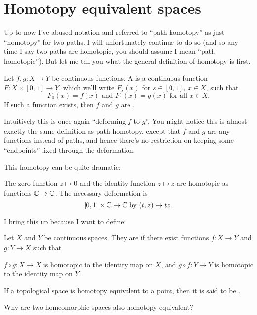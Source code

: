 \section{Homotopy equivalent spaces}
Up to now I've abused notation and referred to ``path homotopy'' as just ``homotopy'' for two paths.
I will unfortunately continue to do so (and so any time I say two paths are homotopic, you should assume I mean ``path-homotopic'').
But let me tell you what the general definition of homotopy is first.
\begin{definition}
	Let $f,g : X \to Y$ be continuous functions.
	A  is a continuous function $F : X \times [0,1] \to Y$,
	which we'll write $F_s(x)$ for $s \in [0,1]$, $x \in X$, such that 
	\[ F_0(x) = f(x) \text{ and } F_1(x) = g(x) \text{ for all $x \in X$.} \]
	If such a function exists, then $f$ and $g$ are .
\end{definition}
Intuitively this is once again ``deforming $f$ to $g$''.
You might notice this is almost exactly the same definition as path-homotopy,
except that $f$ and $g$ are any functions instead of paths, and hence
there's no restriction on keeping some ``endpoints'' fixed through the deformation.

This homotopy can be quite dramatic:
\begin{example}
	The zero function $z \mapsto 0$ and the identity function $z \mapsto z$
	are homotopic as functions $\mathbb C \to \mathbb C$.
	The necessary deformation is
	\[ [0,1] \times \mathbb C \to \mathbb C \text{ by } (t,z) \mapsto tz. \]
\end{example}

I bring this up because I want to define:
\begin{definition}
	Let $X$ and $Y$ be continuous spaces.
	They are  if there exist
	functions $f : X \to Y$ and $g : Y \to X$ such that
	\begin{enumerate}[(i)]
		\ii $f \circ g : X \to X$ is homotopic to the identity map on $X$, and
		\ii $g \circ f : Y \to Y$ is homotopic to the identity map on $Y$.
	\end{enumerate}
	If a topological space is homotopy equivalent to a point,
	then it is said to be .
\end{definition}
\begin{ques}
	Why are two homeomorphic spaces also homotopy equivalent?
\end{ques}

